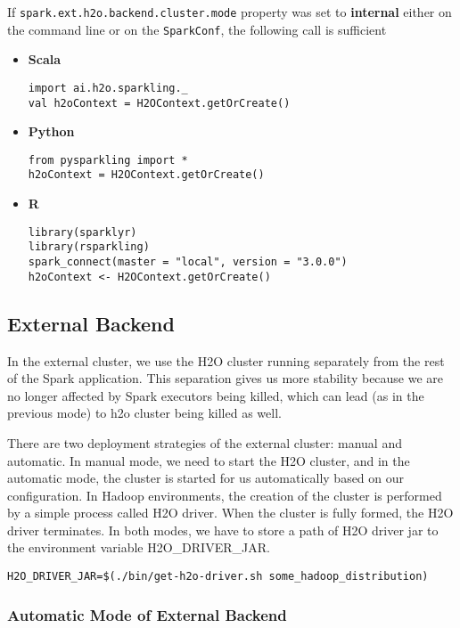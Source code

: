 If \texttt{spark.ext.h2o.backend.cluster.mode} property was set to \textbf{internal} either on the command line or
on the \texttt{SparkConf}, the following call is sufficient

\begin{itemize}
    \item \textbf{Scala} \begin{lstlisting}[style=Scala]
import ai.h2o.sparkling._
val h2oContext = H2OContext.getOrCreate()
    \end{lstlisting}
    \item \textbf{Python} \begin{lstlisting}[style=Python]
from pysparkling import *
h2oContext = H2OContext.getOrCreate()
    \end{lstlisting}
    \item \textbf{R} \begin{lstlisting}[style=R]
library(sparklyr)
library(rsparkling)
spark_connect(master = "local", version = "3.0.0")
h2oContext <- H2OContext.getOrCreate()
    \end{lstlisting}
\end{itemize}

\subsection{External Backend}

In the external cluster, we use the H2O cluster running separately from the rest of the Spark application. This separation
gives us more stability because we are no longer affected by Spark executors being killed, which can
lead (as in the previous mode) to h2o cluster being killed as well.

There are two deployment strategies of the external cluster: manual and automatic. In manual mode, we need to start
the H2O cluster, and in the automatic mode, the cluster is started for us automatically based on our configuration.
In Hadoop environments, the creation of the cluster is performed by a simple process called H2O driver.
When the cluster is fully formed, the H2O driver terminates. In both modes, we have to store a path of H2O driver jar
to the environment variable H2O\_DRIVER\_JAR.

\begin{lstlisting}[style=bash]
H2O_DRIVER_JAR=$(./bin/get-h2o-driver.sh some_hadoop_distribution)
\end{lstlisting}

\subsubsection{Automatic Mode of External Backend}


